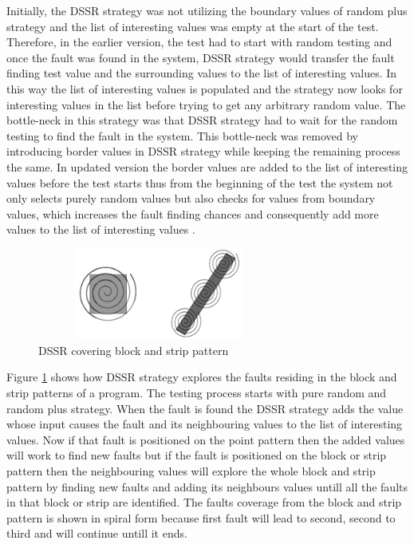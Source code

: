 \documentclass[10pt, conference, compsocconf]{IEEEtran}
\begin{document}
Initially, the DSSR strategy was not utilizing the boundary values of random plus strategy and the list of interesting values was empty at the start of the test. Therefore, in the earlier version, the test had to start with random testing and once the fault was found in the system, DSSR strategy would transfer the fault finding test value and the surrounding values to the list of interesting values. In this way the list of interesting values is populated and the strategy now looks for interesting values in the list before trying to get any arbitrary random value. The bottle-neck in this strategy was that DSSR strategy had to wait for the random testing to find the fault in the system. This bottle-neck was removed by introducing border values in DSSR strategy while keeping the remaining process the same. In updated version the border values are added to the list of interesting values before the test starts thus from the beginning of the test the system not only selects purely random values but also checks for values from boundary values, which increases the fault finding chances and consequently add more values to the list of interesting values \cite{Kaner2004}.\\

\begin{figure}[htp]
\centering
\includegraphics[width=8cm,height=3cm]{block2.png}
\caption{DSSR covering block and strip pattern}
\label{fig:block2}
\end{figure}

Figure \ref{fig:block2} shows how DSSR strategy explores the faults residing in the block and strip patterns of a program. The testing process starts with pure random and random plus strategy. When the fault is found the DSSR strategy adds the value whose input causes the fault and its neighbouring values to the list of interesting values. Now if that fault is positioned on the point pattern then the added values will work to find new faults but if the fault is positioned on the block or strip pattern then the neighbouring values will explore the whole block and strip pattern by finding new faults and adding its neighbours values untill all the faults in that block or strip are identified. The faults coverage from the block and strip pattern is shown in spiral form because first fault will lead to second, second to third and will continue untill it ends.\\
\end{document}
